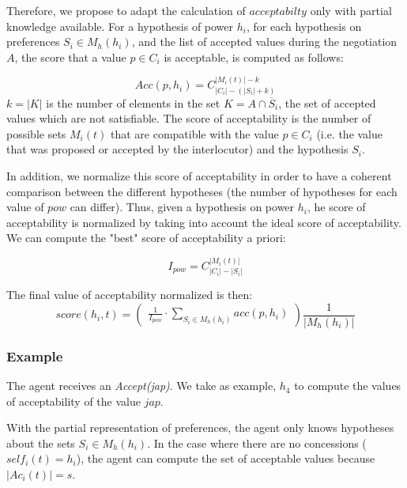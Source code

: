 \documentclass[conference, letterpaper]{IEEEtran}
\begin{document}
		Therefore, we propose to adapt the calculation of $acceptabilty$ only with partial knowledge available. For a hypothesis of power $h_i$, for each hypothesis on preferences $S_i \in M_h(h_i)$, and the list of accepted values during the negotiation $A$, the score that a value $p \in C_i$ is acceptable, is computed as follows:
		
		\begin{equation}
		Acc(p, h_i) = C_{|C_i|-(|S_i| + k)}^{|M_i(t)| - k}
		\end{equation}
		$k = |K| $ is the number of elements in the set $K=A \cap \overline S_i$, the set of accepted values which are not satisfiable. The score of acceptability is the number of possible sets $M_i(t)$ that are compatible with the value $p\in C_i$ (i.e. the value that was proposed or accepted by the interlocutor) and the hypothesis $S_i$.
		

		In addition, we normalize this score of acceptability in order to have a coherent comparison between the different hypotheses (the number of hypotheses for each value of $pow$ can differ). Thus, given a hypothesis on power $h_i$, he score of acceptability is normalized by taking into account the ideal score of acceptability. We can compute the "best" score of acceptability a priori:
		
		$$I_{pow} = C_{|C_i|-|S_i|}^{|M_i(t)|}$$
		
		
		The final value of acceptability normalized is then:
		\begin{equation}
		score(h_i, t)= \left( \begin{array}{c}  \frac{1}{I_{pow}} \cdot \sum_{S_i \in M_h(h_i) } acc(p, h_i) 
		\end{array}\right) \frac{1}{| M_h(h_i)|}
		\end{equation}
		
		
		\subsubsection*{\bf Example}
		
		The agent receives an \emph{Accept(jap)}. We take as example, $h_4$ to compute the values of acceptability of the value $jap$.

		With the partial representation of preferences, the agent only knows hypotheses about the sets $S_i \in M_h(h_i)$.
		In the case where there are no concessions ($self_i(t)=h_i$), the agent can compute the set of acceptable values because $|Ac_i(t)| = s$.
	
\end{document}

